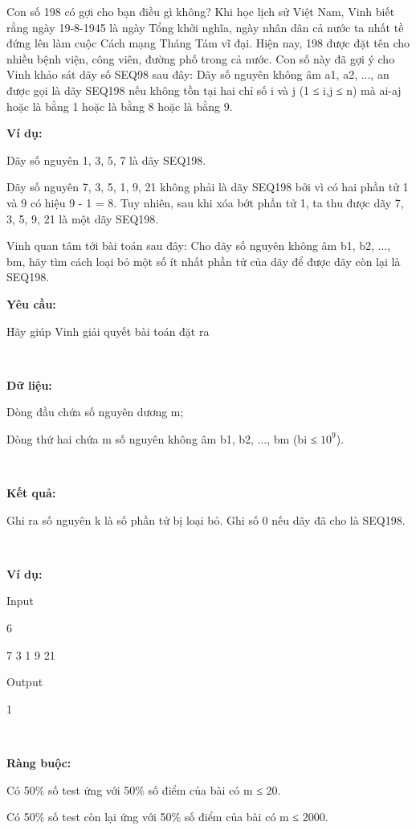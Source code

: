 

Con số 198 có gợi cho bạn điều gì không? Khi học lịch sử Việt Nam, Vinh biết rằng ngày 19-8-1945 là ngày Tổng khởi nghĩa, ngày nhân dân cả nước ta nhất tề đứng lên làm cuộc Cách mạng Tháng Tám vĩ đại. Hiện nay, 198 được đặt tên cho nhiều bệnh viện, công viên, đường phố trong cả nước. Con số này đã gợi ý cho Vinh khảo sát dãy số SEQ98 sau đây: Dãy số nguyên không âm a1, a2, ..., an được gọi là dãy SEQ198 nếu không tồn tại hai chỉ số i và j (1 ≤ i,j ≤ n) mà ai-aj hoặc là bằng 1 hoặc là bằng 8 hoặc là bằng 9.

\textbf{Ví dụ:}

Dãy số nguyên 1, 3, 5, 7 là dãy SEQ198.

Dãy số nguyên 7, 3, 5, 1, 9, 21 không phải là dãy SEQ198 bởi vì có hai phần tử 1 và 9 có hiệu 9 - 1 = 8. Tuy nhiên, sau khi xóa bớt phần tử 1, ta thu được dãy 7, 3, 5, 9, 21 là một dãy SEQ198.

Vinh quan tâm tới bài toán sau đây: Cho dãy số nguyên không âm b1, b2, ..., bm, hãy tìm cách loại bỏ một số ít nhất phần tử của dãy để được dãy còn lại là SEQ198.

\textbf{Yêu cầu:}

Hãy giúp Vinh giải quyết bài toán đặt ra

 

\textbf{Dữ liệu:}

Dòng đầu chứa số nguyên dương m;

Dòng thứ hai chứa m số nguyên không âm b1, b2, ..., bm (bi ≤ $10^{9}$).

 

\textbf{Kết quả:}

Ghi ra số nguyên k là số phần tử bị loại bỏ. Ghi số 0 nếu dãy đã cho là SEQ198.

 

\textbf{Ví dụ:}

Input

6

7 3 1 9 21

Output

1

 

\textbf{Ràng buộc:}

Có 50\% số test ứng với 50\% số điểm của bài có m ≤ 20.

Có 50\% số test còn lại ứng với 50\% số điểm của bài có m ≤ 2000.
